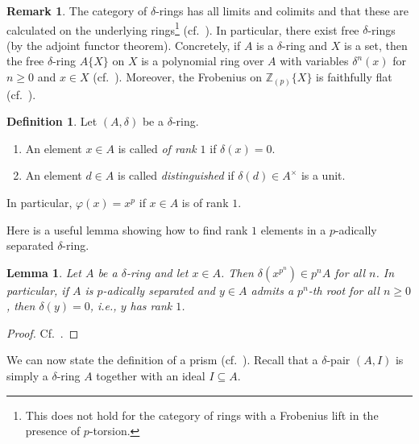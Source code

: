 \documentclass{amsart}
\theoremstyle{plain}
\newtheorem{lemma}[theorem]{Lemma}
\theoremstyle{definition}
\newtheorem{definition}[theorem]{Definition}
\newtheorem{remark}[theorem]{Remark}
\newcommand{\Z}{\mathbb{Z}}
\newcommand{\blue}[1]{{\color{black}#1}}
\begin{document}
\begin{remark}
The category of $\delta$-rings has all limits and colimits and that these are calculated on the underlying rings\footnote{This does not hold for the category of rings with a Frobenius lift in the presence of $p$-torsion.} (cf.\ \cite[Section 1]{bhatt_scholze_prisms_and_prismatic_cohomology}). In particular, there \blue{exist} free $\delta$-rings (by the adjoint functor theorem). Concretely, if $A$ is a $\delta$-ring and $X$ is a set, then the free $\delta$-ring $A\{X\}$ on $X$ is a polynomial ring over $A$ with variables $\delta^n(x)$ for $n\geq 0$ and $x\in X$ (cf.\ \cite[Lemma 2.11]{bhatt_scholze_prisms_and_prismatic_cohomology}).
Moreover, the Frobenius on $\Z_{(p)}\{X\}$ is faithfully flat (cf.\ \cite[Lemma 2.11]{bhatt_scholze_prisms_and_prismatic_cohomology}).
\end{remark}

\begin{definition}
  \label{sec:generalities-prisms-definition-distinguished-element-rank-one-element} Let $(A,\delta)$ be a $\delta$-ring.
  \begin{enumerate}
  \item An element $x\in A$ is called \textit{of rank $1$} if $\delta(x)=0$.
    \item An element $d\in A$ is called \textit{distinguished} if $\delta(d)\in A^\times$ is a unit. 
  \end{enumerate}
\end{definition}

In particular, $\varphi(x)=x^p$ if $x\in A$ is of rank $1$.

Here is a useful lemma showing how to find rank $1$ elements in a $p$-adically separated $\delta$-ring.

\begin{lemma}
  \label{sec:generalities-prisms-lemma-elements-with-p-th-roots-are-of-rank-1}
  Let $A$ be a $\delta$-ring and let $x\in A$. Then $\delta(x^{p^n})\in p^nA$ for all $n$. In particular, if $A$ is $p$-adically separated and $y\in A$ admits a $p^n$-th root for all $n\geq 0$, then $\delta(y)=0$, i.e., $y$ has rank $1$. 
\end{lemma}
\begin{proof}
  Cf.\ \cite[Lemma 2.31]{bhatt_scholze_prisms_and_prismatic_cohomology}.
\end{proof}


We can now state the definition of a prism (cf.\ \cite[Definition 3.2]{bhatt_scholze_prisms_and_prismatic_cohomology}). Recall that a $\delta$-pair $(A,I)$ is simply a $\delta$-ring $A$ together with an ideal $I\subseteq A$.
\end{document}
